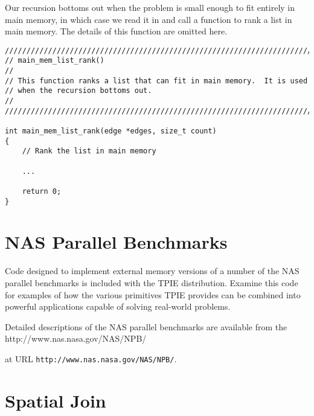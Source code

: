 Our recursion bottoms out when the problem is small enough to fit
entirely in main memory, in which case we read it in and call a
function to rank a list in main memory.  The details of this function
are omitted here.

\begin{verbatim}
////////////////////////////////////////////////////////////////////////
// main_mem_list_rank()
//
// This function ranks a list that can fit in main memory.  It is used
// when the recursion bottoms out.
//
////////////////////////////////////////////////////////////////////////

int main_mem_list_rank(edge *edges, size_t count)
{
    // Rank the list in main memory

    ...
        
    return 0;  
}
\end{verbatim}

\section{NAS Parallel Benchmarks}

\tobeextended

Code designed to implement external memory versions of a number of the
NAS parallel benchmarks is included with the TPIE distribution.
Examine this code for examples of how the various primitives TPIE
provides can be combined into powerful applications capable of solving
real-world problems.

Detailed descriptions of the NAS parallel benchmarks are available
from the %
{http://www.nas.nasa.gov/NAS/NPB/}
\begin{latexonly}
at URL \verb|http://www.nas.nasa.gov/NAS/NPB/|.
\end{latexonly}

\section{Spatial Join}

\tobewritten



